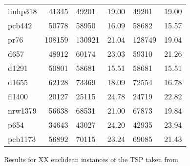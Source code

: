 \begin{figure}[ht]
\begin{minipage}{\linewidth}
\begin{tabular*}{\textwidth}{l||r|| l | l || l | l }
			linhp318 & 41345  & 49201  & 19.00 & 49201  & 19.00 \\
			pcb442   & 50778  & 58950  & 16.09 & 58682  & 15.57 \\
			pr76     & 108159 & 130921 & 21.04 & 128749 & 19.04 \\
			d657     & 48912  & 60174  & 23.03 & 59310  & 21.26 \\
			d1291    & 50801  & 58681  & 15.51 & 58681  & 15.51 \\
			d1655    & 62128  & 73369  & 18.09 & 72554  & 16.78 \\
			fl1400   & 20127  & 25115  & 24.78 & 24719  & 22.82 \\
			nrw1379  & 56638  & 68531  & 21.00 & 67873  & 19.84 \\
			p654     & 34643  & 43027  & 24.20 & 42935  & 23.94 \\
			pcb1173  & 56892  & 70115  & 23.24 & 69085  & 21.43
		\end{tabular*}
	\end{minipage}
	
	\caption{Results for XX euclidean instances of the TSP taken from \cite{REINELT1995}}
	\label{fig:table}
\end{figure}
